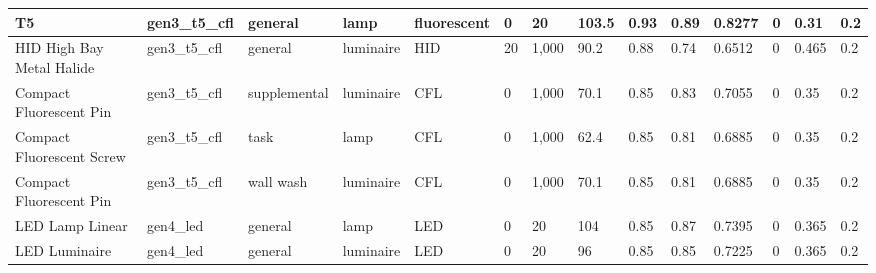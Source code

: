 \begin{center}
\begin{landscape}
\begin{longtable}{|p{0.75in}|p{0.65in}|p{0.47in}|p{0.4in}|p{0.45in}|p{0.4in}|p{0.4in}|p{0.4in}|p{0.4in}|p{0.4in}|p{0.4in}|p{0.4in}|p{0.4in}|p{0.4in}|}
  T5                         & gen3\_t5\_cfl           & general                & lamp          & fluorescent             & 0                     & 20                    & 103.5                           & 0.93                    & 0.89                        & 0.8277               & 0                   & 0.31             & 0.2              \\ \hline
  HID High Bay Metal Halide  & gen3\_t5\_cfl           & general                & luminaire     & HID                     & 20                    & 1,000                  & 90.2                            & 0.88                    & 0.74                        & 0.6512               & 0                   & 0.465            & 0.2              \\ \hline
  Compact Fluorescent Pin    & gen3\_t5\_cfl           & supplemental           & luminaire     & CFL                     & 0                     & 1,000                  & 70.1                            & 0.85                    & 0.83                        & 0.7055               & 0                   & 0.35             & 0.2              \\ \hline
  Compact Fluorescent Screw  & gen3\_t5\_cfl           & task                   & lamp          & CFL                     & 0                     & 1,000                  & 62.4                            & 0.85                    & 0.81                        & 0.6885               & 0                   & 0.35             & 0.2              \\ \hline
  Compact Fluorescent Pin    & gen3\_t5\_cfl           & wall wash              & luminaire     & CFL                     & 0                     & 1,000                  & 70.1                            & 0.85                    & 0.81                        & 0.6885               & 0                   & 0.35             & 0.2              \\ \hline
  LED Lamp Linear            & gen4\_led               & general                & lamp          & LED                     & 0                     & 20                    & 104                             & 0.85                    & 0.87                        & 0.7395               & 0                   & 0.365            & 0.2              \\ \hline
  LED Luminaire              & gen4\_led               & general                & luminaire     & LED                     & 0                     & 20                    & 96                              & 0.85                    & 0.85                        & 0.7225               & 0                   & 0.365            & 0.2              \\ \hline

\end{longtable}
\end{landscape}
\end{center}
